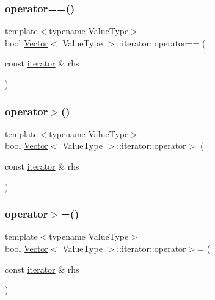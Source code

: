 \mbox{\label{classVector_1_1iterator_a67bb3347e32785eeae9226d6ffd81281}} 
\subsubsection{\texorpdfstring{operator==()}{operator==()}}
{\footnotesize\ttfamily template$<$typename Value\+Type$>$ \\
bool \mbox{\hyperlink{classVector}{Vector}}$<$ Value\+Type $>$\+::iterator\+::operator== (\begin{DoxyParamCaption}\item[{const \mbox{\hyperlink{classVector_1_1iterator}{iterator}} \&}]{rhs }\end{DoxyParamCaption})\hspace{0.3cm}{\ttfamily [inline]}}

\mbox{\label{classVector_1_1iterator_a3f2c9b91d423fe7c80e7a130b365342f}} 
\subsubsection{\texorpdfstring{operator$>$()}{operator>()}}
{\footnotesize\ttfamily template$<$typename Value\+Type$>$ \\
bool \mbox{\hyperlink{classVector}{Vector}}$<$ Value\+Type $>$\+::iterator\+::operator$>$ (\begin{DoxyParamCaption}\item[{const \mbox{\hyperlink{classVector_1_1iterator}{iterator}} \&}]{rhs }\end{DoxyParamCaption})\hspace{0.3cm}{\ttfamily [inline]}}

\mbox{\label{classVector_1_1iterator_a41d2ff94db2ea5dd92c31f495143a968}} 
\subsubsection{\texorpdfstring{operator$>$=()}{operator>=()}}
{\footnotesize\ttfamily template$<$typename Value\+Type$>$ \\
bool \mbox{\hyperlink{classVector}{Vector}}$<$ Value\+Type $>$\+::iterator\+::operator$>$= (\begin{DoxyParamCaption}\item[{const \mbox{\hyperlink{classVector_1_1iterator}{iterator}} \&}]{rhs }\end{DoxyParamCaption})\hspace{0.3cm}{\ttfamily [inline]}}

